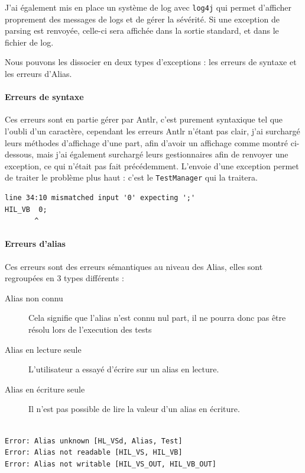J'ai également mis en place un système de log avec \texttt{log4j} qui permet d'afficher proprement des messages de logs et de gérer la sévérité. Si une exception de parsing est renvoyée, celle-ci sera affichée dans la sortie standard, et dans le fichier de log.

Nous pouvons les dissocier en deux types d'exceptions : les erreurs de syntaxe et les erreurs d'Alias. 
\paragraph{Erreurs de syntaxe} Ces erreurs sont en partie gérer par Antlr, c'est purement syntaxique tel que l'oubli d'un caractère, cependant les erreurs Antlr n'étant pas clair, j'ai surchargé leurs méthodes d'affichage d'une part, afin d'avoir un affichage comme montré ci-dessous, mais j'ai également surchargé leurs gestionnaires afin de renvoyer une exception, ce qui n'était pas fait précédemment. L'envoie d'une exception permet de traiter le problème plus haut : c'est le \texttt{TestManager} qui la traitera.
\begin{lstlisting}[caption=Affichage d'une erreur de syntaxe, numbers=none]
line 34:10 mismatched input '0' expecting ';'
HIL_VB  0;
       ^
\end{lstlisting}


\paragraph{Erreurs d'alias} Ces erreurs sont des erreurs sémantiques au niveau des Alias, elles sont regroupées en 3 types différents : 
\begin{description}
	\item[Alias non connu] Cela signifie que l'alias n'est connu nul part, il ne pourra donc pas être résolu lors de l'execution des tests
	\item[Alias en lecture seule] L'utilisateur a essayé d'écrire sur un alias en lecture.
	\item[Alias en écriture seule] Il n'est pas possible de lire la valeur d'un alias en écriture.\\~
\end{description}

\begin{lstlisting}[caption=Affichage d'une erreur d'alias, numbers=none]
Error: Alias unknown [HL_VSd, Alias, Test]
Error: Alias not readable [HIL_VS, HIL_VB]
Error: Alias not writable [HIL_VS_OUT, HIL_VB_OUT]
\end{lstlisting}
		
